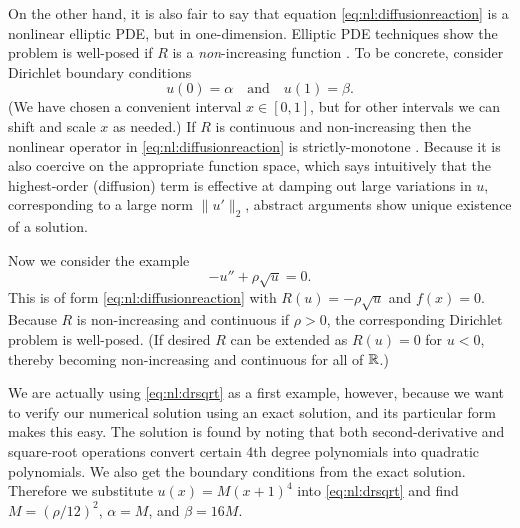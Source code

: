 On the other hand, it is also fair to say that equation \eqref{eq:nl:diffusionreaction} is a nonlinear elliptic PDE, but in one-dimension.  Elliptic PDE techniques show the problem is well-posed if $R$ is a \emph{non}-increasing function \citep[pages 93-94]{KinderlehrerStampacchia1980}.  To be concrete, consider Dirichlet boundary conditions
\begin{equation}
u(0)=\alpha \quad \text{and} \quad u(1)=\beta.  \label{eq:nl:drbcs}
\end{equation}
(We have chosen a convenient interval $x\in[0,1]$, but for other intervals we can shift and scale $x$ as needed.)  If $R$ is continuous and non-increasing then the nonlinear operator in \eqref{eq:nl:diffusionreaction} is strictly-monotone \citep{KinderlehrerStampacchia1980}.  Because it is also coercive on the appropriate function space, which says intuitively that the highest-order (diffusion) term is effective at damping out large variations in $u$, corresponding to a large norm $\|u'\|_2$, abstract arguments show unique existence of a solution.

Now we consider the example
\begin{equation}
-u'' + \rho \sqrt{u} = 0. \label{eq:nl:drsqrt}
\end{equation}
This is of form \eqref{eq:nl:diffusionreaction} with $R(u) = - \rho \sqrt{u}$ and $f(x)=0$.  Because $R$ is non-increasing and continuous if $\rho>0$, the corresponding Dirichlet problem is well-posed.  (If desired $R$ can be extended as $R(u)=0$ for $u<0$, thereby becoming non-increasing and continuous for all of $\mathbb{R}$.)


We are actually using \eqref{eq:nl:drsqrt} as a first example, however, because we want to verify our numerical solution using an exact solution, and its particular form makes this easy.  The solution is found \citep{Ockendonetal2003} by noting that both second-derivative and square-root operations convert certain 4th degree polynomials into quadratic polynomials.  We also get the boundary conditions from the exact solution.  Therefore we substitute $u(x)=M(x+1)^4$ into \eqref{eq:nl:drsqrt} and find $M=(\rho/12)^2$, $\alpha=M$, and $\beta=16 M$.

